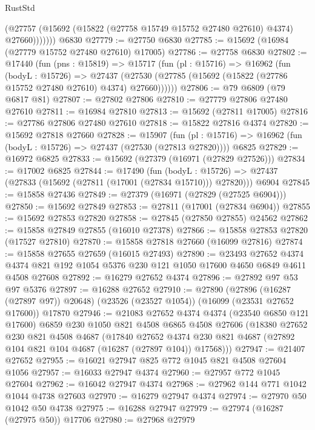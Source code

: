 \begin{lexlean}{RustStd}
\begin{coremodule}
              (@27757 (@15692 (@15822 (@27758 @15749 @15752 @27480 @27610) @4374) @27660)))))))
    @6830
@27779 := @27750 @6830
@27785 := @15692 (@16984 (@27779 @15752 @27480 @27610) @17005)
@27786 := @27758 @6830
@27802 := @17440
    (fun (pns : @15819) =>
    @15717
      (fun (pl : @15716) =>
      @16962
        (fun (bodyL : @15726) =>
        @27437 (@27530 (@27785 (@15692 (@15822 (@27786 @15752 @27480 @27610) @4374) @27660))))))
@27806 := @79 @6809 (@79 @6817 @81)
@27807 := @27802 @27806
@27810 := @27779 @27806 @27480 @27610
@27811 := @16984 @27810
@27813 := @15692 (@27811 @17005)
@27816 := @27786 @27806 @27480 @27610
@27818 := @15822 @27816 @4374
@27820 := @15692 @27818 @27660
@27828 := @15907
    (fun (pl : @15716) => @16962 (fun (bodyL : @15726) => @27437 (@27530 (@27813 @27820))))
    @6825
@27829 := @16972 @6825
@27833 := @15692 (@27379 (@16971 (@27829 @27526)))
@27834 := @17002 @6825
@27844 := @17490
    (fun (bodyL : @15726) => @27437 (@27833 (@15692 (@27811 (@17001 (@27834 @15710))) @27820)))
    @6904
@27845 := @15858 @27436
@27849 := @27379 (@16971 (@27829 (@27525 @6904)))
@27850 := @15692 @27849
@27853 := @27811 (@17001 (@27834 @6904))
@27855 := @15692 @27853 @27820
@27858 := @27845 (@27850 @27855) @24562
@27862 := @15858 @27849 @27855 (@16010 @27378)
@27866 := @15858 @27853 @27820 (@17527 @27810)
@27870 := @15858 @27818 @27660 (@16099 @27816)
@27874 := @15858 @27655 @27659 (@16015 @27493)
@27890 := @23493
    @27652
    @4374
    @4374
    @821
    @192
    @1054
    @5376
    @230
    @121
    @1050
    @17600
    @4650
    @6849
    @4611
    @4508
    @27608
@27892 := @16279 @27652 @4374
@27896 := @27892 @97 @53 @97 @5376
@27897 := @16288 @27652
@27910 := @27890
    (@27896 (@16287 (@27897 @97)) @20648)
    (@23526 (@23527 @1054))
    (@16099 (@23531 @27652 @17600))
    @17870
@27946 := @21083
    @27652
    @4374
    @4374
    (@23540 @6850 @121 @17600)
    @6859
    @230
    @1050
    @821
    @4508
    @6865
    @4508
    @27606
    (@18380
      @27652
      @230
      @821
      @4508
      @4687
      (@17840
        @27652
        @4374
        @230
        @821
        @4687
        (@27892 @104 @821 @104 @4687 (@16287 (@27897 @104)) @17568)))
@27947 := @21407 @27652
@27955 := @16021 @27947 @825 @772 @1045 @821 @4508 @27604 @1056
@27957 := @16033 @27947 @4374
@27960 := @27957 @772 @1045 @27604
@27962 := @16042 @27947 @4374
@27968 := @27962 @144 @771 @1042 @1044 @4738 @27603
@27970 := @16279 @27947 @4374
@27974 := @27970 @50 @1042 @50 @4738
@27975 := @16288 @27947
@27979 := @27974 (@16287 (@27975 @50)) @17706
@27980 := @27968 @27979

\end{coremodule}
\end{lexlean}
